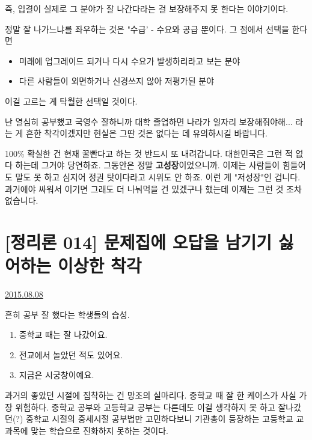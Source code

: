 즉, 입결이 실제로 그 분야가 잘 나간다라는 걸 보장해주지 못 한다는 이야기이다.
\vspace{5mm}

정말 잘 나가느냐를 좌우하는 것은 "수급' - 수요와 공급 뿐이다.
그 점에서 선택을 한다면
\begin{itemize}
    \item  미래에 업그레이드 되거나 다시 수요가 발생하리라고 보는 분야
    \item  다른 사람들이 외면하거나 신경쓰지 않아 저평가된 분야
\end{itemize}
이걸 고르는 게 탁월한 선택일 것이다.
\vspace{5mm}

난 열심히 공부했고 국영수 잘하니까 대학 졸업하면 나라가 일자리 보장해줘야해...
라는 게 흔한 착각이겠지만 현실은 그딴 것은 없다는 데 유의하시길 바랍니다.
\vspace{5mm}

100$\%$ 확실한 건 현재 꿀빤다고 하는 것 반드시 또 내려갑니다.
대한민국은 그런 적 없다 하는데 그거야 당연하죠. 그동안은 정말 \textbf{고성장}이었으니까.
이제는 사람들이 힘들어도 말도 못 하고 심지어 정권 탓이다라고 시위도 안 하죠. 이런 게 "저성장"인 겁니다.
과거에야 싸워서 이기면 그래도 더 나눠먹을 건 있겠구나 했는데 이제는 그런 것 조차 없습니다.
\vspace{5mm}






\section{[정리론 014] 문제집에 오답을 남기기 싫어하는 이상한 착각}
\href{https://www.kockoc.com/Apoc/237400}{2015.08.08}

\vspace{5mm}

흔히 공부 잘 했다는 학생들의 습성.
\vspace{5mm}
\begin{enumerate}
    \item  중학교 때는 잘 나갔어요.
    \item  전교에서 놀았던 적도 있어요.
    \item  지금은 시궁창이예요.
\end{enumerate}
\vspace{5mm}

과거의 좋았던 시절에 집착하는 건 망조의 실마리다.
중학교 때 잘 한 케이스가 사실 가장 위험하다.
중학교 공부와 고등학교 공부는 다른데도 이걸 생각하지 못 하고
잘나갔던(?) 중학교 시절의 중세시절 공부법만 고민하다보니
기관총이 등장하는 고등학교 교과목에 맞는 학습으로 진화하지 못하는 것이다.
\vspace{5mm}

